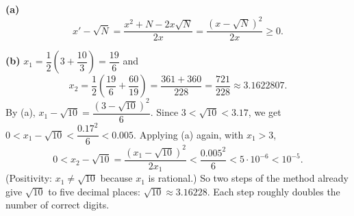 \textbf{(a)}
\[
x'-\sqrt N=\dfrac{x^2+N-2x\sqrt N}{2x}=\dfrac{(x-\sqrt N)^2}{2x}\ge0 .
\]

\textbf{(b)} $x_1=\dfrac{1}{2}\left(3+\dfrac{10}{3}\right)=\dfrac{19}{6}$ and
\[
x_2=\dfrac{1}{2}\left(\dfrac{19}{6}+\dfrac{60}{19}\right)=\dfrac{361+360}{228}=\dfrac{721}{228}\approx3.1622807 .
\]
By (a), $x_1-\sqrt{10}=\dfrac{(3-\sqrt{10})^2}{6}$. Since $3<\sqrt{10}<3.17$, we get $0<x_1-\sqrt{10}<\dfrac{0.17^2}{6}<0.005$. Applying (a) again, with $x_1>3$,
\[
0<x_2-\sqrt{10}=\dfrac{(x_1-\sqrt{10})^2}{2x_1}<\dfrac{0.005^2}{6}<5\cdot10^{-6}<10^{-5}.
\]
(Positivity: $x_1\ne\sqrt{10}$ because $x_1$ is rational.) So two steps of the method already give $\sqrt{10}$ to five decimal places: $\sqrt{10}\approx3.16228$. Each step roughly doubles the number of correct digits.
